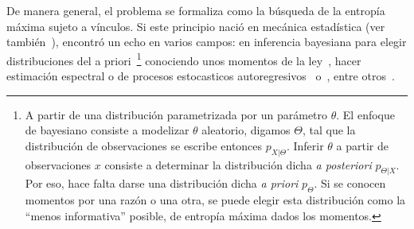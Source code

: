 De manera general, el problema se  formaliza como la b\'usqueda de la entrop\'ia
m\'axima  sujeto  a  v\'inculos.    Si  este  principio  naci\'o  en  mec\'anica
estad\'istica (ver  tambi\'en~\cite{Jay57, Jay57:2, Jay65}),  encontr\'o un echo
en  varios campos:  en inferencia  bayesiana  para elegir  distribuciones del  a
priori~\footnote{A partir de una distribuci\'on parametrizada por un par\'ametro
  $\theta$.  El  enfoque de bayesiano  consiste a modelizar  $\theta$ aleatorio,
  digamos  $\Theta$,  tal que  la  distribuci\'on  de  observaciones se  escribe
  entonces  $p_{X|\Theta}$.   Inferir $\theta$  a  partir  de observaciones  $x$
  consiste   a   determinar  la   distribuci\'on   dicha   {\it  a   posteriori}
  $p_{\Theta|X}$.  Por  eso, hace  falta darse una  distribuci\'on dicha  {\it a
    priori} $p_\Theta$.  Si  se conocen momentos por una raz\'on  o una otra, se
  puede elegir esta distribuci\'on como la ``menos informativa'' posible, \ie de
  entrop\'ia m\'axima dados  los momentos.\label{foot:SZ:Prior}} conociendo unos
momentos  de  la  ley~\cite{Rob07,  Jay68,  Jay82,  Csi91},  hacer  estimaci\'on
espectral o  de procesos estocasticos  autoregresivos~\cite{Bur67, Bur75, Jay82}
o~\cite[cap.~12]{CovTho06}, entre otros~\cite[\& ref.]{KapKes92}.

